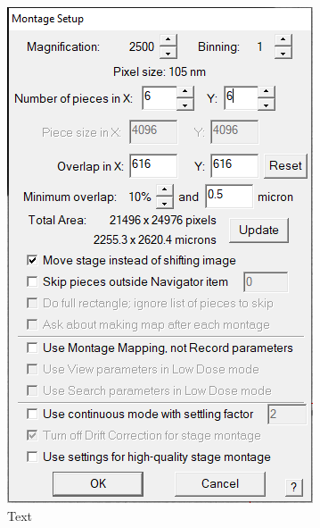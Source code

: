 \documentclass[12pt, a4paper]{scrartcl}
\begin{document}
\begin{figure}[H]
\includegraphics[scale=1]{screenshots/OverviewSetup1.png}
\caption{Text}
\end{figure}
\end{document}
